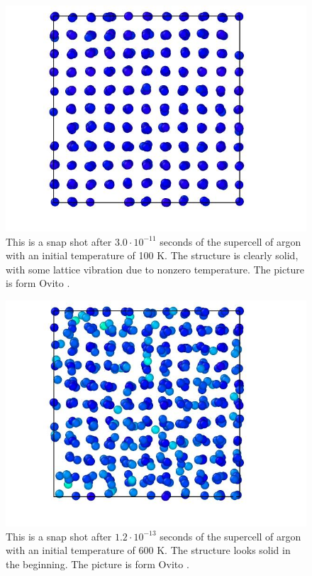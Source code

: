 \begin{multicols}{2}

\begin{figure}[H]
\includegraphics[width=\linewidth]{../figures/solid_100}\caption{This is a snap shot after $3.0 \cdot 10^{-11}$ seconds of the supercell of argon with an initial temperature of 100 K. The structure is clearly solid, with some lattice vibration due to nonzero temperature. The picture is form Ovito \cite{ovito}.}\label{fig:solid_100K}
\end{figure}

\begin{figure}[H]
\includegraphics[width=\linewidth]{../figures/solid_600}\caption{This is a snap shot after $1.2 \cdot 10^{-13}$ seconds of the supercell of argon with an initial temperature of 600 K. The structure looks solid in the beginning. The picture is form Ovito \cite{ovito}.}\label{fig:solid_600K}
\end{figure}


\end{multicols}
